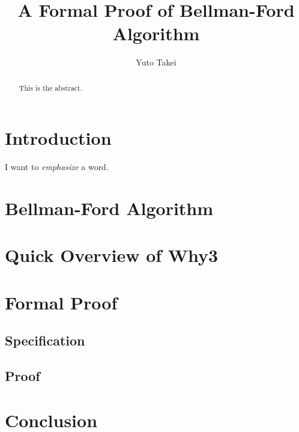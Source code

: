 \documentclass[a4paper,12pt]{article}
\title{A Formal Proof of Bellman-Ford Algorithm}
\author{Yuto Takei}
\begin{document}
\maketitle

\begin{abstract}
  This is the abstract.
\end{abstract}

\section{Introduction}

I want to \emph{emphasize} a word.

\section{Bellman-Ford Algorithm}

\section{Quick Overview of Why3}

\section{Formal Proof}

\subsection{Specification}

\subsection{Proof}

\section{Conclusion}
\end{document}
